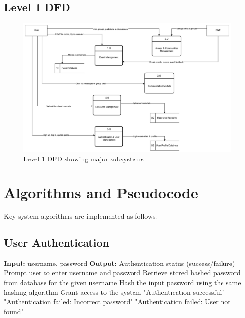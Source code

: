 \subsection{Level 1 DFD}
\begin{figure}[H]
    \centering
    \includegraphics[width=\textwidth]{latex-doc/images/dfd_level1.png}
    \caption{Level 1 DFD showing major subsystems}
    \label{fig:dfd1}
\end{figure}


\vspace{3cm}


\section{Algorithms and Pseudocode}
\label{sec:algorithms}

Key system algorithms are implemented as follows:

\subsection{User Authentication}
\begin{algorithmic}[1]
\State \textbf{Input:} username, password
\State \textbf{Output:} Authentication status (success/failure)
\State
\State Prompt user to enter username and password
\State Retrieve stored hashed password from database for the given username
    \State Hash the input password using the same hashing algorithm
        \State Grant access to the system
        \State \Return "Authentication successful"
    \Else
        \State \Return "Authentication failed: Incorrect password"
    \EndIf
\Else
    \State \Return "Authentication failed: User not found"
\EndIf
\end{algorithmic}

